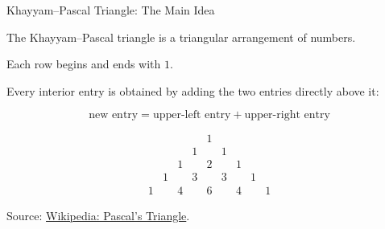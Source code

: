 \begin{frame}{Khayyam--Pascal Triangle: The Main Idea}

The Khayyam--Pascal triangle is a triangular arrangement of numbers.

\vspace{0.25cm}

Each row begins and ends with $1$.

\vspace{0.25cm}

Every interior entry is obtained by adding the two entries directly above it:





\begin{tcolorbox}[
colback=blue!5,
colframe=blue!70!black,
arc=2mm,
boxrule=0.8pt,
left=2mm,
right=2mm,
top=1mm,
bottom=1mm
]
\[
\text{new entry} = \text{upper-left entry} + \text{upper-right entry}\]
\end{tcolorbox}








\[
\begin{array}{ccccccccc}
&&&&1&&&&\\[1mm]
&&&1&&1&&&\\[1mm]
&&1&&2&&1&&\\[1mm]
&1&&3&&3&&1&\\[1mm]
1&&4&&6&&4&&1
\end{array}
\]

\vspace{0.2cm}

{\scriptsize Source: \href{https://en.wikipedia.org/wiki/Pascal\%27s_triangle}{Wikipedia: Pascal's Triangle}.}

\end{frame}


